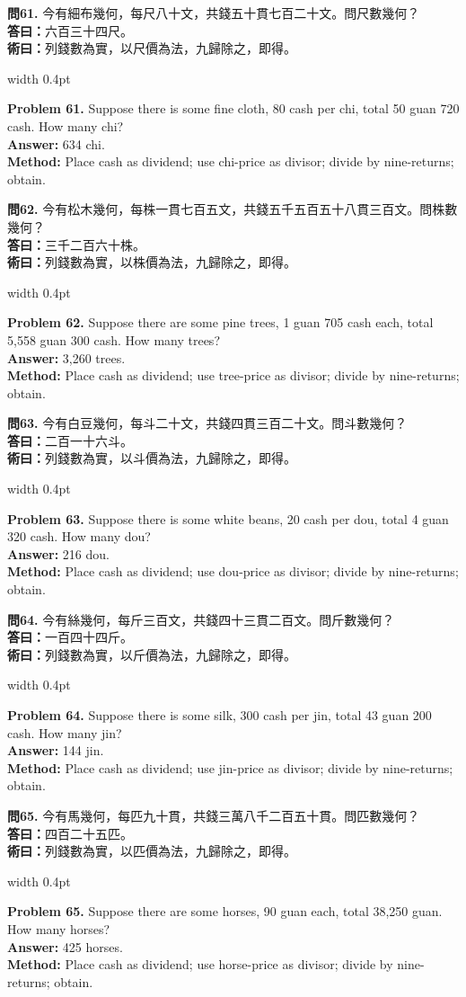 \documentclass[10pt,a4paper]{article}
\newlength{\cnwidth}
\newlength{\enwidth}
\newcommand{\bilingual}[2]{%
  \noindent%
  \begin{minipage}[t]{\cnwidth}%
    #1%
  \end{minipage}%
  \hfill\vrule width 0.4pt\hfill%
  \begin{minipage}[t]{\enwidth}%
    #2%
  \end{minipage}%
  \par\smallskip%
}
\begin{document}
\bilingual{%
  \textbf{問61.}
  今有細布幾何，每尺八十文，共錢五十貫七百二十文。問尺數幾何？\\
  \textbf{答曰：}六百三十四尺。\\
  \textbf{術曰：}列錢數為實，以尺價為法，九歸除之，即得。
}{%
  \textbf{Problem 61.}
  Suppose there is some fine cloth, 80 cash per chi, total 50 guan 720 cash.
  How many chi?\\
  \textbf{Answer:} 634 chi.\\
  \textbf{Method:} Place cash as dividend; use chi-price as divisor; divide by
  nine-returns; obtain.
}

\bilingual{%
  \textbf{問62.}
  今有松木幾何，每株一貫七百五文，共錢五千五百五十八貫三百文。問株數幾何？\\
  \textbf{答曰：}三千二百六十株。\\
  \textbf{術曰：}列錢數為實，以株價為法，九歸除之，即得。
}{%
  \textbf{Problem 62.}
  Suppose there are some pine trees, 1 guan 705 cash each, total 5,558 guan 300 cash.
  How many trees?\\
  \textbf{Answer:} 3,260 trees.\\
  \textbf{Method:} Place cash as dividend; use tree-price as divisor; divide by
  nine-returns; obtain.
}

\bilingual{%
  \textbf{問63.}
  今有白豆幾何，每斗二十文，共錢四貫三百二十文。問斗數幾何？\\
  \textbf{答曰：}二百一十六斗。\\
  \textbf{術曰：}列錢數為實，以斗價為法，九歸除之，即得。
}{%
  \textbf{Problem 63.}
  Suppose there is some white beans, 20 cash per dou, total 4 guan 320 cash.
  How many dou?\\
  \textbf{Answer:} 216 dou.\\
  \textbf{Method:} Place cash as dividend; use dou-price as divisor; divide by
  nine-returns; obtain.
}

\bilingual{%
  \textbf{問64.}
  今有絲幾何，每斤三百文，共錢四十三貫二百文。問斤數幾何？\\
  \textbf{答曰：}一百四十四斤。\\
  \textbf{術曰：}列錢數為實，以斤價為法，九歸除之，即得。
}{%
  \textbf{Problem 64.}
  Suppose there is some silk, 300 cash per jin, total 43 guan 200 cash.
  How many jin?\\
  \textbf{Answer:} 144 jin.\\
  \textbf{Method:} Place cash as dividend; use jin-price as divisor; divide by
  nine-returns; obtain.
}

\bilingual{%
  \textbf{問65.}
  今有馬幾何，每匹九十貫，共錢三萬八千二百五十貫。問匹數幾何？\\
  \textbf{答曰：}四百二十五匹。\\
  \textbf{術曰：}列錢數為實，以匹價為法，九歸除之，即得。
}{%
  \textbf{Problem 65.}
  Suppose there are some horses, 90 guan each, total 38,250 guan.
  How many horses?\\
  \textbf{Answer:} 425 horses.\\
  \textbf{Method:} Place cash as dividend; use horse-price as divisor; divide by
  nine-returns; obtain.
}
\end{document}

